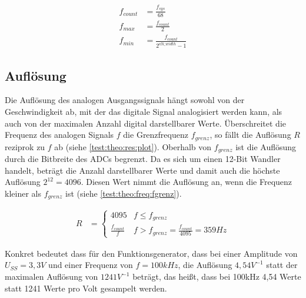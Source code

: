 \begin{align}
  f_{count} &= \frac{f_{sys}}{68} \label{test:theo:freq:fcount}\\  
  f_{max} &= \frac{f_{count}}{2}  \label{test:theo:freq:fmax}\\ 
  f_{min} &= \frac{f_{count}}{2^{clk\_width} - 1} \label{test:theo:freq:fmin}
\end{align}

\subsection{Auflösung}
Die Auflösung des analogen Ausgangssignals hängt sowohl von der Geschwindigkeit ab, mit der das digitale Signal analogisiert werden kann, als auch von der maximalen Anzahl digital darstellbarer Werte.
Überschreitet die Frequenz des analogen Signals $f$ die Grenzfrequenz $f_{grenz}$, so fällt die Auflösung $R$ reziprok zu $f$ ab (siehe \cref{test:theo:res:plot}).
Oberhalb von $f_{grenz}$ ist die Auflösung durch die Bitbreite des ADCs begrenzt.
Da es sich um einen 12-Bit Wandler handelt, beträgt die Anzahl darstellbarer Werte und damit auch die höchste Auflösung $2^{12} = 4096$.
Diesen Wert nimmt die Auflösung an, wenn die Frequenz kleiner als $f_{grenz}$ ist (siehe \cref{test:theo:freq:fgrenz}).

\begin{align}
  R &= \begin{cases}
    4095               & f \leq f_{grenz}                      \\
    \frac{f_{count}}{f} & f > f_{grenz} = \frac{f_{count}}{4095} = 359 Hz
        \end{cases} \label{test:theo:freq:fgrenz}
\end{align}

Konkret bedeutet dass für den Funktionsgenerator, dass bei einer Amplitude von $U_{SS}=3,3V$ und einer Frequenz von $f=100kHz$, die Auflösung $4,54V^{-1}$ statt der maximalen Auflösung von $1241V^{-1}$ beträgt, das heißt, dass bei 100kHz 4,54 Werte statt 1241 Werte pro Volt gesampelt werden.

